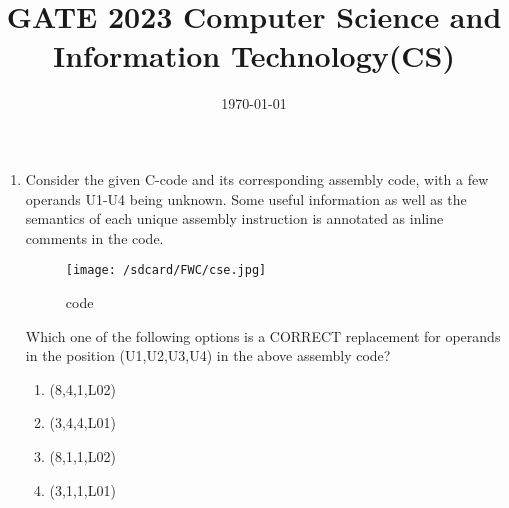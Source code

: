 \documentclass[12pt]{article}
\begin{document}
\title{\textbf{GATE 2023 Computer Science and Information Technology(CS)}}                   
\date{\today}                      
\maketitle                         
\begin{enumerate}                  
\item 
Consider the given C-code and its corresponding assembly code, with a few operands U1-U4 being unknown. Some useful information as well as
the semantics of each unique assembly instruction is annotated as inline comments in the code.                          
\begin{figure}
\centering                              
\texttt{[image: /sdcard/FWC/cse.jpg]}        
\caption{code}                     
\label{fig:code}
\end{figure}

Which one of the following options is a CORRECT replacement for operands in the position (U1,U2,U3,U4) in the above assembly code?

\begin{enumerate}[label=(\Alph*)]  
\item (8,4,1,L02)                  
\item (3,4,4,L01)
\item (8,1,1,L02)                  
\item (3,1,1,L01)                  
\end{enumerate}                    
\end{enumerate}
\end{document}
